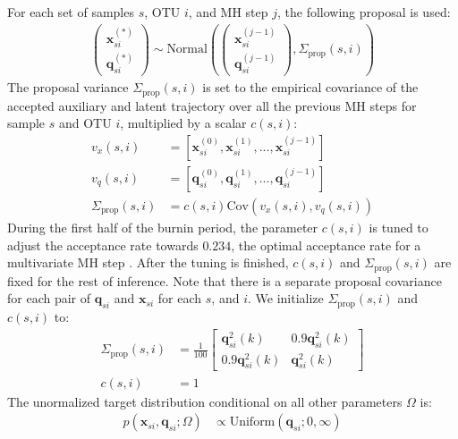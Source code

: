 \documentclass{article}
\newcommand{\Normaldist}{\text{Normal}}
\newcommand{\Uniformdist}{\text{Uniform}}
\newcommand{\qq}{\mathbf{q}}
\newcommand{\xx}{\mathbf{x}}
\newcommand{\qexp}[3]{\mathbf{q}^{#3}_{#2}(#1)}
\begin{document}
\begin{appendices}
  For each set of samples $s$, OTU $i$, and MH step $j$, the following proposal is used:
  \begin{align}
  	\left(
  	\begin{array}{ccc}
  		\xx_{si}^{(*)} \\
  		\qq_{si}^{(*)}
  	\end{array} \right)
  	\sim \Normaldist \left(
  		\left(
  		\begin{array}{ccc}
  			\xx_{si}^{(j-1)} \\
  			\qq_{si}^{(j-1)}
  		\end{array} \right), \Sigma_{\text{prop}}(s,i)
  	\right)
  \end{align}
  The proposal variance $\Sigma_{\text{prop}}(s,i)$ is set to the empirical covariance of the accepted auxiliary and latent trajectory over all the previous MH steps for sample $s$ and OTU $i$, multiplied by a scalar $c(s,i)$:
  \begin{align}
  	v_x (s,i) & = [\xx_{si}^{(0)}, \xx_{si}^{(1)}, ..., \xx_{si}^{(j-1)}] \\
  	v_q (s,i) & = [\qq_{si}^{(0)}, \qq_{si}^{(1)}, ..., \qq_{si}^{(j-1)}] \\
  	\Sigma_{\text{prop}}(s,i) & = c(s,i) \text{Cov}(v_x (s,i), v_q (s,i))
  \end{align}
  During the first half of the burnin period, the parameter $c(s,i)$ is tuned to adjust the acceptance rate towards $0.234$, the optimal acceptance rate for a multivariate MH step \cite{cite:BDA}. After the tuning is finished, $c(s,i)$ and $\Sigma_{\text{prop}}(s,i)$ are fixed for the rest of inference. Note that there is a separate proposal covariance for each pair of $\qq_{si}$ and $\xx_{si}$ for each $s$, and $i$. We initialize $\Sigma_{\text{prop}}(s,i)$ and $c(s,i)$ to:
  \begin{align}
    \Sigma_{\text{prop}}(s,i) & = \frac{1}{100} \left[
      \begin{array}{ccc}
      \qexp{k}{si}{2} & 0.9 \qexp{k}{si}{2} \\
      0.9 \qexp{k}{si}{2} & \qexp{k}{si}{2}
      \end{array} \right] \\
    c(s,i) & = 1
  \end{align}
  The unormalized target distribution conditional on all other parameters $\Omega$ is:
  \begin{align}
  \label{eqn:likelihood_aux_traj_a0_a1}
  	p(\xx_{si}, \qq_{si} ; \Omega) & \propto \Uniformdist(\qq_{si}; 0, \infty) \\

\end{align}
\end{appendices}
\end{document}
